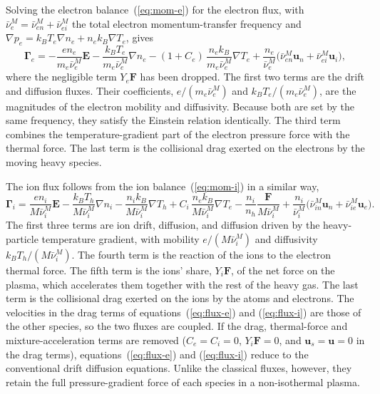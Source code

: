 Solving the electron balance~(\ref{eq:mom-e}) for the electron flux, with \(\bar\nu^M_e=\bar\nu^M_{en}+\bar\nu^M_{ei}\) the total electron momentum-transfer frequency and \(\nabla p_e=k_BT_e\nabla n_e+n_ek_B\nabla T_e\), gives
\begin{equation}
\boldsymbol{\Gamma}_e=-\frac{en_e}{m_e\bar\nu^M_e}\mathbf{E}
-\frac{k_BT_e}{m_e\bar\nu^M_e}\nabla n_e
-(1+C_e)\,\frac{n_ek_B}{m_e\bar\nu^M_e}\nabla T_e
+\frac{n_e}{\bar\nu^M_e}\Big(\bar\nu^M_{en}\mathbf{u}_n+\bar\nu^M_{ei}\mathbf{u}_i\Big),
\label{eq:flux-e}
\end{equation}
where the negligible term \(Y_e\mathbf{F}\) has been dropped. The first two terms are the drift and diffusion fluxes. Their coefficients, \(e/(m_e\bar\nu^M_e)\) and \(k_BT_e/(m_e\bar\nu^M_e)\), are the magnitudes of the electron mobility and diffusivity. Because both are set by the same frequency, they satisfy the Einstein relation identically. The third term combines the temperature-gradient part of the electron pressure force with the thermal force. The last term is the collisional drag exerted on the electrons by the moving heavy species.

The ion flux follows from the ion balance~(\ref{eq:mom-i}) in a similar way,
\begin{equation}
\boldsymbol{\Gamma}_i=\frac{en_i}{M\bar\nu^M_i}\mathbf{E}
-\frac{k_BT_h}{M\bar\nu^M_i}\nabla n_i
-\frac{n_ik_B}{M\bar\nu^M_i}\nabla T_h
+C_i\,\frac{n_ek_B}{M\bar\nu^M_i}\nabla T_e
-\frac{n_i}{n_h}\frac{\mathbf{F}}{M\bar\nu^M_i}
+\frac{n_i}{\bar\nu^M_i}\Big(\bar\nu^M_{in}\mathbf{u}_n+\bar\nu^M_{ie}\mathbf{u}_e\Big).
\label{eq:flux-i}
\end{equation}
The first three terms are ion drift, diffusion, and diffusion driven by the heavy-particle temperature gradient, with mobility \(e/(M\bar\nu^M_i)\) and diffusivity \(k_BT_h/(M\bar\nu^M_i)\). The fourth term is the reaction of the ions to the electron thermal force. The fifth term is the ions' share, \(Y_i\mathbf{F}\), of the net force on the plasma, which accelerates them together with the rest of the heavy gas. The last term is the collisional drag exerted on the ions by the atoms and electrons. The velocities in the drag terms of equations~(\ref{eq:flux-e}) and (\ref{eq:flux-i}) are those of the other species, so the two fluxes are coupled. If the drag, thermal-force and mixture-acceleration terms are removed (\(C_e=C_i=0\), \(Y_i\mathbf{F}=0\), and \(\mathbf{u}_s=\mathbf{u}=0\) in the drag terms), equations~(\ref{eq:flux-e}) and (\ref{eq:flux-i}) reduce to the conventional drift diffusion equations. Unlike the classical fluxes, however, they retain the full pressure-gradient force of each species in a non-isothermal plasma.

